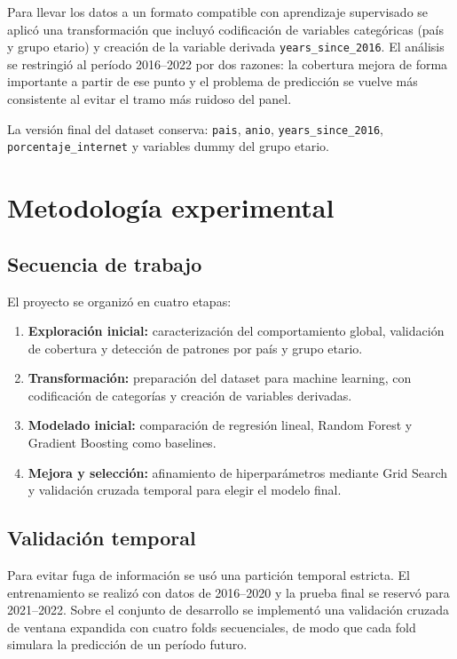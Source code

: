 \documentclass[12pt,a4paper]{article}
\begin{document}
Para llevar los datos a un formato compatible con aprendizaje supervisado se aplic\'o una transformaci\'on que incluy\'o codificaci\'on de variables categ\'oricas (pa\'is y grupo etario) y creaci\'on de la variable derivada \texttt{years\_since\_2016}. El an\'alisis se restringi\'o al per\'iodo 2016--2022 por dos razones: la cobertura mejora de forma importante a partir de ese punto y el problema de predicci\'on se vuelve m\'as consistente al evitar el tramo m\'as ruidoso del panel.

La versi\'on final del dataset conserva: \texttt{pais}, \texttt{anio}, \texttt{years\_since\_2016}, \texttt{porcentaje\_internet} y variables dummy del grupo etario.

\section{Metodolog\'ia experimental}

\subsection{Secuencia de trabajo}

El proyecto se organiz\'o en cuatro etapas:

\begin{enumerate}
    \item \textbf{Exploraci\'on inicial:} caracterizaci\'on del comportamiento global, validaci\'on de cobertura y detecci\'on de patrones por pa\'is y grupo etario.
    \item \textbf{Transformaci\'on:} preparaci\'on del dataset para machine learning, con codificaci\'on de categor\'ias y creaci\'on de variables derivadas.
    \item \textbf{Modelado inicial:} comparaci\'on de regresi\'on lineal, Random Forest y Gradient Boosting como baselines.
    \item \textbf{Mejora y selecci\'on:} afinamiento de hiperpar\'ametros mediante Grid Search y validaci\'on cruzada temporal para elegir el modelo final.
\end{enumerate}

\subsection{Validaci\'on temporal}

Para evitar fuga de informaci\'on se us\'o una partici\'on temporal estricta. El entrenamiento se realiz\'o con datos de 2016--2020 y la prueba final se reserv\'o para 2021--2022. Sobre el conjunto de desarrollo se implement\'o una validaci\'on cruzada de ventana expandida con cuatro folds secuenciales, de modo que cada fold simulara la predicci\'on de un per\'iodo futuro.
\end{document}
